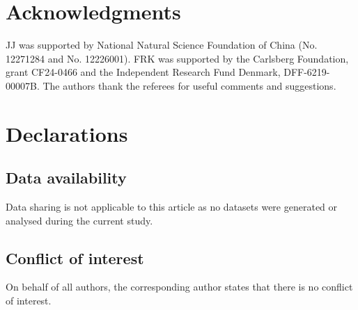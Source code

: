 \documentclass[article,12pt,reqno]{amsart}
\begin{document}
\section*{Acknowledgments}
JJ was supported by National Natural Science Foundation of China (No. 12271284 and No. 12226001). FRK was supported by the Carlsberg Foundation, grant CF24-0466 and the Independent Research Fund Denmark, DFF-6219-00007B. The authors thank the referees for useful comments and suggestions.



\section*{Declarations}
\subsection*{Data availability\nopunct}
Data sharing is not applicable to this article as no datasets were generated or analysed during the current study.
\subsection*{Conflict of interest\nopunct}
On behalf of all authors, the corresponding author states that there is no conflict of interest.




\end{document}
